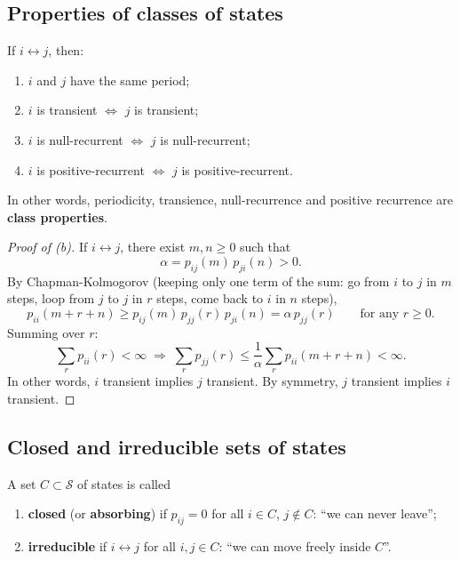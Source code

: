 \subsection{Properties of classes of states}

\begin{theorem}
If $i \leftrightarrow j$, then:
\begin{enumerate}
    \item[(a)] $i$ and $j$ have the same period;
    \item[(b)] $i$ is transient $\iff$ $j$ is transient;
    \item[(c)] $i$ is null-recurrent $\iff$ $j$ is null-recurrent;
    \item[(d)] $i$ is positive-recurrent $\iff$ $j$ is positive-recurrent.
\end{enumerate}
In other words, periodicity, transience, null-recurrence and positive recurrence are \textbf{class properties}.
\end{theorem}

\begin{proof}[Proof of (b)]
If $i \leftrightarrow j$, there exist $m, n \geq 0$ such that
\[
\alpha = p_{ij}(m)\, p_{ji}(n) > 0.
\]
By Chapman-Kolmogorov (keeping only one term of the sum: go from $i$ to $j$ in $m$ steps, loop from $j$ to $j$ in $r$ steps, come back to $i$ in $n$ steps),
\[
p_{ii}(m + r + n) \geq p_{ij}(m)\, p_{jj}(r)\, p_{ji}(n) = \alpha\, p_{jj}(r) \qquad \text{for any } r \geq 0.
\]
Summing over $r$:
\[
\sum_r p_{ii}(r) < \infty \;\Rightarrow\; \sum_r p_{jj}(r) \leq \frac{1}{\alpha}\sum_r p_{ii}(m+r+n) < \infty.
\]
In other words, $i$ transient implies $j$ transient. By symmetry, $j$ transient implies $i$ transient.
\end{proof}

\subsection{Closed and irreducible sets of states}

\begin{definition}
A set $C \subset \mathcal{S}$ of states is called
\begin{enumerate}
    \item[(a)] \textbf{closed} (or \textbf{absorbing}) if $p_{ij} = 0$ for all $i \in C$, $j \notin C$: ``we can never leave'';
    \item[(b)] \textbf{irreducible} if $i \leftrightarrow j$ for all $i, j \in C$: ``we can move freely inside $C$''.
\end{enumerate}
\end{definition}


